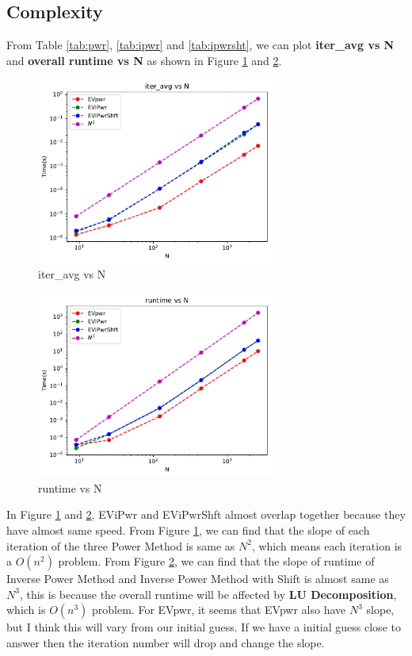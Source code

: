 \documentclass{article}
\begin{document}
\subsection{Complexity}
From Table \ref{tab:pwr}, \ref{tab:ipwr} and \ref{tab:ipwrsht}, we can plot \textbf{iter\_avg vs N} and \textbf{overall runtime vs N} as shown in 
Figure \ref{fig:iter_avg vs N} and \ref{fig:runtime vs N}.
\begin{figure}[H]
    \centering
    \includegraphics[width=0.7\textwidth]{src/iter_avg.pdf}
    \caption{iter\_avg vs N}
    \label{fig:iter_avg vs N}
\end{figure}
\begin{figure}[H]
    \centering
    \includegraphics[width=0.7\textwidth]{src/runtime.pdf}
    \caption{runtime vs N}
    \label{fig:runtime vs N}
\end{figure}
In Figure \ref{fig:iter_avg vs N} and \ref{fig:runtime vs N}, EViPwr and EViPwrShft almost overlap together because they have almost same speed.
From Figure \ref{fig:iter_avg vs N}, we can find that the slope of each iteration of the three Power Method is same as $N^2$, which means
each iteration is a $O(n^2)$ problem. From Figure \ref{fig:runtime vs N}, we can find that the slope of runtime of Inverse Power Method and
Inverse Power Method with Shift is almost same as $N^3$, this is because the overall runtime will be affected by \textbf{LU Decomposition}, 
which is $O(n^3)$ problem. For EVpwr, it seems that EVpwr also have $N^3$ slope, but I think this will vary from our initial guess. If
we have a initial guess close to answer then the iteration number will drop and change the slope.
\end{document}
